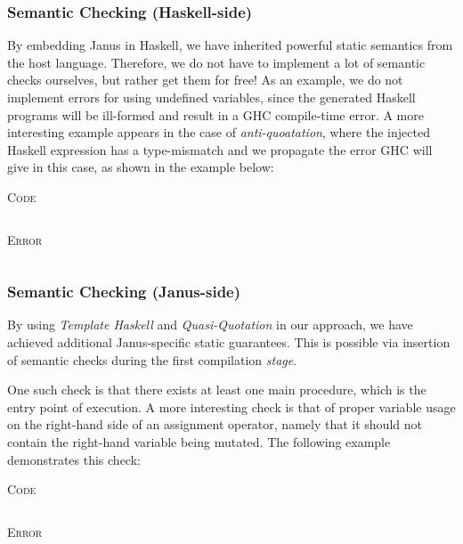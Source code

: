 \documentclass[12pt,a4paper]{article}
\newcommand{\code}[2]{
 \begin{center} \textsc{\small #1} \end{center}
 \inputminted[frame=lines,framesep=.5cm,baselinestretch=.8,linenos,fontsize=\footnotesize]
         {haskell}{code/#2.hs}
}
\newcommand{\codeErr}[1]{
 \begin{center} \textsc{\small Error} \end{center}
 \inputminted[frame=lines,framesep=.5cm,baselinestretch=.8,fontsize=\footnotesize]
         {bash}{code/#1_err.hs}
}
\begin{document}
\subsubsection{Semantic Checking (Haskell-side)}
By embedding Janus in Haskell, we have inherited powerful static semantics from the host language. Therefore, we do not have to implement a lot of semantic checks ourselves, but rather get them for free! As an example, we do not implement errors for using undefined variables, since the generated Haskell programs will be ill-formed and result in a GHC compile-time error. A more interesting example appears in the case of \textit{anti-quoatation}, where the injected Haskell expression has a type-mismatch and we propagate the error GHC will give in this case, as shown in the example below:
\\[10pt]
\hspace*{.05\textwidth}
\begin{minipage}{.4\textwidth}
\code{Code}{semH}
\end{minipage}
\hspace*{.05\textwidth}
\begin{minipage}{.5\textwidth}
\codeErr{semH}
\end{minipage}

\subsubsection{Semantic Checking (Janus-side)}
By using \textit{Template Haskell} and \textit{Quasi-Quotation} in our approach, we have achieved additional Janus-specific static guarantees. This is possible via insertion of semantic checks during the first compilation \textit{stage}.

One such check is that there exists at least one main procedure, which is the entry point of execution. A more interesting check is that of proper variable usage on the right-hand side of an assignment operator, namely that it should not contain the right-hand variable being mutated. The following example demonstrates this check:

\begin{minipage}{.3\textwidth}
\code{Code}{semJ}
\end{minipage}
\hspace*{.2\textwidth}
\begin{minipage}{.5\textwidth}
\codeErr{semJ}
\end{minipage}
\vspace*{1cm}
\end{document}
